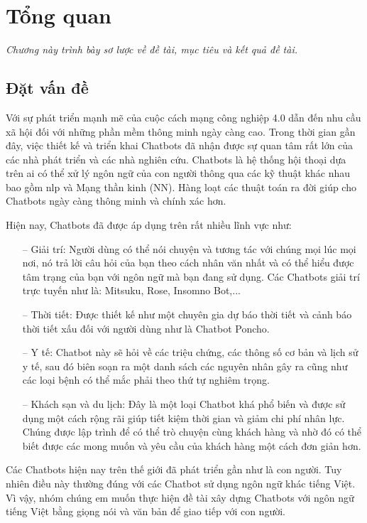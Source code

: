 \chapter{Tổng quan}
\label{Chapter1}

\emph{Chương này trình bày sơ lược về đề tài, mục tiêu và kết quả đề tài.}

\section{Đặt vấn đề}

Với sự phát triển mạnh mẽ của cuộc cách mạng công nghiệp 4.0 dẫn đến nhu cầu xã hội đối với những phần mềm thông minh ngày càng cao. Trong thời gian gần đây, việc thiết kế và triển khai Chatbots đã nhận được sự quan tâm rất lớn của các nhà phát triển và các nhà nghiên cứu. Chatbots là hệ thống hội thoại dựa trên \ac{ai} có thể xử lý ngôn ngữ của con người thông qua các kỹ thuật khác nhau bao gồm \ac{nlp} và Mạng thần kinh (NN). Hàng loạt các thuật toán ra đời giúp cho Chatbots ngày càng thông minh và chính xác hơn.

Hiện nay, Chatbots đã được áp dụng trên rất nhiều lĩnh vực như:
\begin{itemize}
    \item[--] Giải trí: Người dùng có thể nói chuyện và tương tác với chúng mọi lúc mọi nơi, nó trả lời câu hỏi của bạn theo cách nhân văn nhất và có thể hiểu được tâm trạng của bạn với ngôn ngữ mà bạn đang sử dụng. Các Chatbots giải trí trực tuyến như là: Mitsuku, Rose, Insomno Bot,...
    \item[--] Thời tiết: Được thiết kế như một chuyên gia dự báo thời tiết và cảnh báo thời tiết xấu đối với người dùng như là Chatbot Poncho.
    \item[--] Y tế: Chatbot này sẽ hỏi về các triệu chứng, các thông số cơ bản và lịch sử y tế, sau đó biên soạn ra một danh sách các nguyên nhân gây ra cũng như các loại bệnh có thể mắc phải theo thứ tự nghiêm trọng.
    \item[--] Khách sạn và du lịch: Đây là một loại Chatbot khá phổ biến và được sử dụng một cách rộng rãi giúp tiết kiệm thời gian và giảm chi phí nhân lực. Chúng được lập trình để có thể trò chuyện cùng khách hàng và nhờ đó có thể biết được các mong muốn và yêu cầu của khách hàng một cách đơn giản hơn.
\end{itemize}

Các Chatbots hiện nay trên thế giới đã phát triển gần như là con người. Tuy nhiên điều này thường đúng với các Chatbot sử dụng ngôn ngữ khác tiếng Việt. Vì vậy, nhóm chúng em muốn thực hiện đề tài xây dựng Chatbots với ngôn ngữ tiếng Việt bằng giọng nói và văn bản để giao tiếp với con người.

